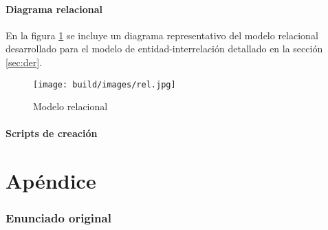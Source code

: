 \documentclass[a4paper,11pt]{article}
\begin{document}
\subsection{Diagrama relacional}

 En la figura \ref{fig:relacional} se incluye un diagrama representativo del
 modelo relacional desarrollado para el modelo de entidad-interrelación
 detallado en la sección \ref{sec:der}.

\begin{figure}[h!t]
	\centering
	\texttt{[image: build/images/rel.jpg]}
	\caption{Modelo relacional} \label{fig:relacional}
\end{figure}

\FloatBarrier

\subsection{Scripts de creación}


%

\clearpage

\part{Apéndice}
\appendix

\section{Enunciado original}\label{sec:enunciado}

\end{document}
